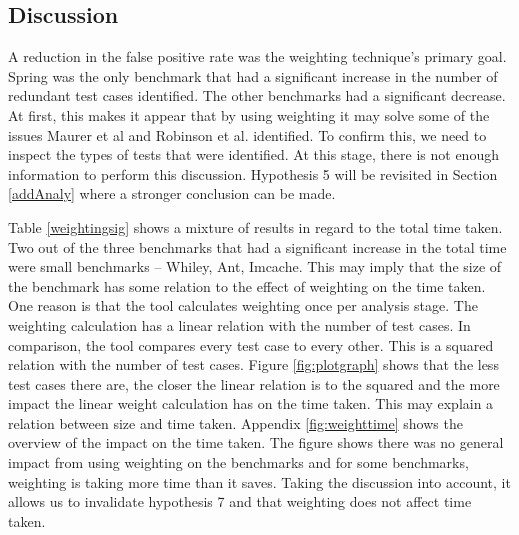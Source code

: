 \subsection{Discussion}
A reduction in the false positive rate was the weighting technique's primary goal. Spring was the only benchmark that had a significant increase in the number of redundant test cases identified. The other benchmarks had a significant decrease. At first, this makes it appear that by using weighting it may solve some of the issues Maurer et al  \cite{koochakzadeh2009test} and Robinson et al. \cite{li2008static} identified. To confirm this, we need to inspect the types of tests that were identified. At this stage, there is not enough information to perform this discussion. Hypothesis 5 will be revisited in Section \ref{addAnaly} where a stronger conclusion can be made.

Table \ref{weightingsig} shows a mixture of results in regard to the total time taken. Two out of the three benchmarks that had a significant increase in the total time were small benchmarks -- Whiley, Ant, Imcache. This may imply that the size of the benchmark has some relation to the effect of weighting on the time taken. One reason is that the tool calculates weighting once per analysis stage. The weighting calculation has a linear relation with the number of test cases. In comparison, the tool compares every test case to every other. This is a squared relation with the number of test cases. Figure \ref{fig:plotgraph} shows that the less test cases there are, the closer the linear relation is to the squared and the more impact the linear weight calculation has on the time taken. This may explain a relation between size and time taken. Appendix \ref{fig:weighttime} shows the overview of the impact on the time taken. The figure shows there was no general impact from using weighting on the benchmarks and for some benchmarks, weighting is taking more time than it saves. Taking the discussion into account, it allows us to invalidate hypothesis 7 and that weighting does not affect time taken.

